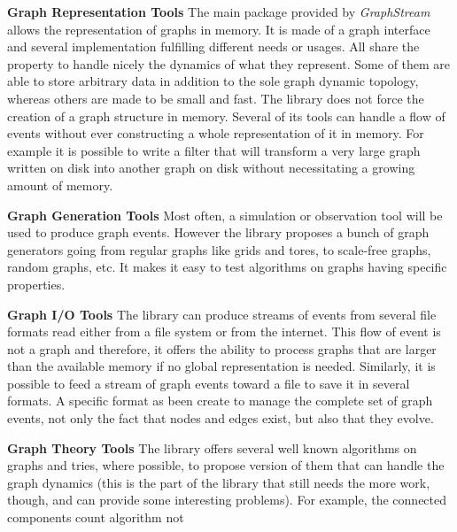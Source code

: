 \documentclass{svmult}
\begin{document}
\begin{description}
         \item{\textbf{Graph Representation Tools}} The main package provided by \emph{GraphStream}
                allows the representation of graphs in memory. It is made of a graph interface and several
                implementation fulfilling different needs or usages. All share the property to handle
                nicely the dynamics of what they represent. Some of them are able to store arbitrary data
                in addition to the sole graph dynamic topology, whereas others are made to be small and
                fast. The library does not force the creation of a graph structure in memory. Several of
                its tools can handle a flow of events without ever constructing a whole representation of
                it in memory. For example it is possible to write a filter that will transform a very large
                graph written on disk into another graph on disk without necessitating a growing amount of
                memory.
         \item{\textbf{Graph Generation Tools}} Most often, a simulation or observation tool will be
                used to produce graph events. However the library proposes a bunch of graph generators going
                from regular graphs like grids and tores, to scale-free graphs, random graphs, etc. It makes
                it easy to test algorithms on graphs having specific properties.
         \item{\textbf{Graph I/O Tools}} The library can produce streams of events from several file
                formats read either from a file system or from the internet. This flow of event is not a
                graph and therefore, it offers the ability to process graphs that are larger than the
                available memory if no global representation is needed. Similarly, it is possible to feed a
                stream of graph events toward a file to save it in several formats. A specific format as
                been create to manage the complete set of graph events, not only the fact that nodes and
                edges exist, but also that they evolve.
         \item{\textbf{Graph Theory Tools}} The library offers several well known algorithms on graphs
                and tries, where possible, to propose version of them that can handle the graph dynamics
                (this is the part of the library that still needs the more work, though, and can
                provide some interesting problems). For example, the connected components count algorithm not

\end{description}
\end{document}
